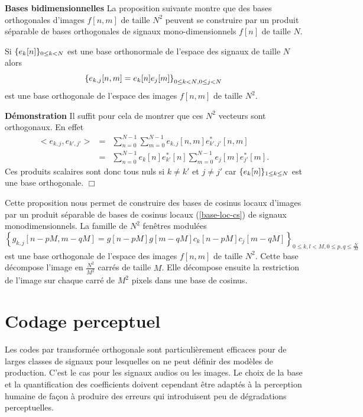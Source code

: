 {\bf Bases bidimensionnelles}
La proposition suivante montre que
des bases orthogonales d'images $f[n,m]$ de taille $N^2$ peuvent
se construire par un produit s\'eparable de bases orthogonales
de signaux mono-dimensionnels $f[n]$ de taille $N$.

\begin{proposition}
Si $\{e_k [n]\}_{ 0 \leq k < N}$ est une
base orthonormale de l'espace des signaux de taille $N$ alors
\[
\left\{e_{k,j} [n,m] = e_k [n] e_j [m] \right\}_{{ 0 \leq k < N}, 0 \leq j < N}
\]
est une base orthogonale de l'espace
des images $f[n,m]$ de taille $N^2$.
\end{proposition}

{\bf D\'emonstration}
Il suffit pour cela de montrer que ces $N^2$ vecteurs sont
orthogonaux. En effet
\begin{eqnarray*}
<e_{k,j} , e_{k',j'}> &=&
\sum_{n=0}^{N-1}\sum_{m=0}^{N-1}
e_{k,j}[n,m] e_{k',j'}^* [n,m] \\
&=&
\sum_{n=0}^{N-1}
e_{k}[n] e_{k'}^* [n] \sum_{m=0}^{N-1}
e_{j}[m] e_{j'}^* [m] .
\end{eqnarray*}
Ces produits scalaires sont donc tous nuls si $k \neq k'$
et $j \neq j'$ car $\{e_k [n]\}_{ 1 \leq k \leq N}$ est une base orthogonale.
$\Box$

Cette proposition nous permet de construire des
bases
de cosinus locaux d'images par un produit s\'eparable de
bases de cosinus locaux (\ref{base-loc-cs})
de signaux monodimensionnels.
La famille de $N^2$ fen\^etres modul\'ees
\begin{equation}
\left\{ g_{k,j} [n-pM,m-qM] =
g[n-pM] g[m-qM] c_k [n-pM] c_j [m-qM]
\right\}_{0 \leq k,l < M, 0 \leq p,q \leq \frac N M}
\end{equation}
est une base orthogonale de l'espace des images $f[n,m]$ de
taille $N^2$.
Cette base d\'ecompose l'image en $\frac {N^2} {M^2}$ carr\'es
de taille $M$. Elle d\'ecompose ensuite
la restriction de l'image
sur chaque carr\'e de $M^2$ pixels dans une base de cosinus.

\section{Codage perceptuel}
\label{percept-code}

Les codes par transform\'ee orthogonale sont particuli\`erement
efficaces pour de larges classes de signaux pour lesquelles on ne
peut d\'efinir des mod\`eles de production.
C'est le cas pour les signaux audios ou les images.
Le choix de la base et la quantification des coefficients
doivent cependant \^etre adapt\'es \`a la perception humaine de
fa\c con \`a produire des erreurs qui introduisent peu de d\'egradations
perceptuelles.

